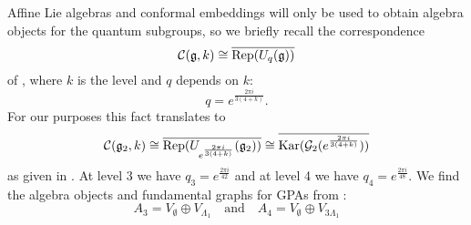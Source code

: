 \begin{remark}
    Affine Lie algebras and conformal embeddings will only be used to obtain algebra objects for the quantum subgroups, so we briefly recall the correspondence 
    \[
        \mathcal{C}(\mathfrak{g},k) \cong \overline{\operatorname{Rep}(U_{q}(\mathfrak{g}))}
    \]
    of \cite{}, where $k$ is the level and $q$ depends on $k$:
    \[
        q = e^{\frac{2\pi i}{3(4+k)}}.
    \]
    For our purposes this fact translates to 
    \begin{equation}\label{eq:G2-affine-quantum}
        \mathcal{C}(\mathfrak{g}_2,k) \cong \overline{\operatorname{Rep}(U_{e^{\frac{2\pi i}{3(4+k)}}}(\mathfrak{g}_2))} \cong \overline{\operatorname{Kar}(\mathcal{G}_2(e^{\frac{2\pi i}{3(4+k)}}))}
    \end{equation}
    as given in \cite{cain_autoequivalences}.
    At level 3 we have $q_3 = e^{\frac{2\pi i}{42}}$ and at level 4 we have $q_4 = e^{\frac{2\pi i}{48}}$.
    We find the algebra objects and fundamental graphs for GPAs from \cite{g2_graphs}:
    \begin{equation}\label{eq:alg-objetcs}
        A_3 = V_{\emptyset} \oplus V_{\Lambda_1} \quad\text{and}\quad A_4 = V_{\emptyset} \oplus V_{3\Lambda_1}
    \end{equation}
\end{remark}



